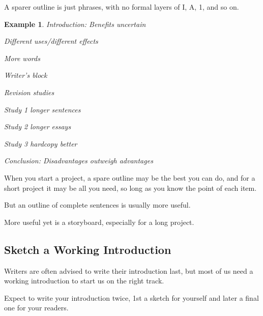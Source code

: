 \documentclass[oneside]{book}
\numberwithin{equation}{section}
\newtheorem{example}{Example}[section]
\begin{document}
 A sparer outline is just phrases, with no formal layers of I, A, 1, and so on.
\begin{example}
    Introduction: Benefits uncertain
    
    Different uses/different effects
    
    \hspace{5mm} More words
    
    \hspace{5mm} Writer's block
    
    Revision studies
    
    \hspace{5mm} Study 1 longer sentences
    
    \hspace{5mm} Study 2 longer essays
    
    \hspace{5mm} Study 3 hardcopy better
    
    Conclusion: Disadvantages outweigh advantages
\end{example}
When you start a project, a spare outline may be the best you can do, and for a short project it may be all you need, so long as you know the point of each item.

But an outline of complete sentences is usually more useful.

More useful yet is a storyboard, especially for a long project.

\subsection{Sketch a Working Introduction}
Writers are often advised to write their introduction last, but most of us need a working introduction to start us on the right track.

Expect to write your introduction twice, 1st a sketch for yourself and later a final one for your readers.
\end{document}
